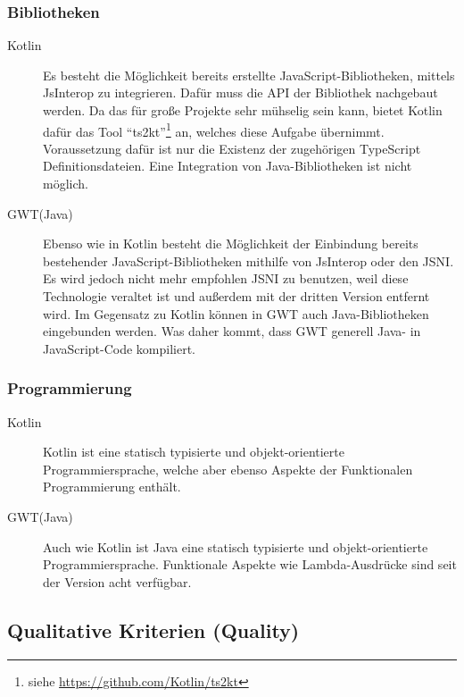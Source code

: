 \subsubsection{Bibliotheken}
\begin{description}
	\item[Kotlin] Es besteht die Möglichkeit bereits erstellte JavaScript-Bibliotheken, mittels \gls{JsInterop} zu integrieren. Dafür muss die \gls{API} der Bibliothek nachgebaut werden. Da das für große Projekte sehr mühselig sein kann, bietet Kotlin dafür das Tool \enquote{ts2kt}\footnote{siehe \url{https://github.com/Kotlin/ts2kt}} an, welches diese Aufgabe übernimmt. Voraussetzung dafür ist nur die Existenz der zugehörigen TypeScript Definitionsdateien. Eine Integration von Java-Bibliotheken ist nicht möglich. \cite{kotlinJsInteop, kotlinJsJavaToJs}
	\item[GWT(Java)] Ebenso wie in Kotlin besteht die Möglichkeit der Einbindung bereits bestehender JavaScript-Bibliotheken mithilfe von \gls{JsInterop} oder den \gls{JSNI}. Es wird jedoch nicht mehr empfohlen  \gls{JSNI} zu benutzen, weil diese Technologie veraltet ist und außerdem mit der dritten Version entfernt wird. Im Gegensatz zu Kotlin können in \gls{GWT} auch Java-Bibliotheken eingebunden werden. Was daher kommt, dass \gls{GWT} generell Java- in JavaScript-Code kompiliert. \cite{gwtJsInterop, gwtJSNI}
\end{description}

\subsubsection{Programmierung}
\begin{description}
	\item[Kotlin] Kotlin ist eine statisch typisierte und objekt-orientierte Programmiersprache, welche aber ebenso Aspekte der Funktionalen Programmierung enthält. \cite{kotlinInfo}
	\item[GWT(Java)] Auch wie Kotlin ist Java eine statisch typisierte und objekt-orientierte Programmiersprache. Funktionale Aspekte wie Lambda-Ausdrücke sind seit der Version acht verfügbar. \cite{java8Specification}
\end{description}

\subsection{Qualitative Kriterien (Quality)}
